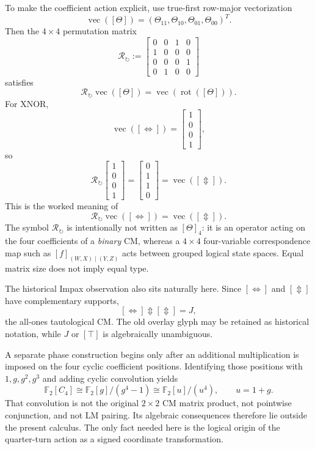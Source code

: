 \documentclass[11pt]{article}
\theoremstyle{definition}
\theoremstyle{remark}
\newcommand{\F}{\mathbb F}
\newcommand{\rot}{\operatorname{rot}}
\newcommand{\vecop}{\operatorname{vec}}
\newcommand{\xor}{\mathbin{\Updownarrow}}
\begin{document}
To make the coefficient action explicit, use true-first row-major vectorization
\[
 \vecop([\Theta])=(\Theta_{11},\Theta_{10},\Theta_{01},\Theta_{00})^T.
\]
Then the $4\times4$ permutation matrix
\begin{equation}
 \mathcal R_{\circlearrowright}:=
 \begin{bmatrix}
 0&0&1&0\\
 1&0&0&0\\
 0&0&0&1\\
 0&1&0&0
 \end{bmatrix}
 \label{eq:rhoquarter}
\end{equation}
satisfies
\[
 \mathcal R_{\circlearrowright}\vecop([\Theta])
 =\vecop(\rot([\Theta])).
\]
For XNOR,
\[
 \vecop([\Leftrightarrow])=
 \begin{bmatrix}1\\0\\0\\1\end{bmatrix},
\]
so
\[
 \mathcal R_{\circlearrowright}
 \begin{bmatrix}1\\0\\0\\1\end{bmatrix}
 =
 \begin{bmatrix}0\\1\\1\\0\end{bmatrix}
 =\vecop([\Updownarrow]).
\]
This is the worked meaning of
\[
 \mathcal R_{\circlearrowright}\vecop([\Leftrightarrow])
 =\vecop([\Updownarrow]).
\]
The symbol $\mathcal R_{\circlearrowright}$ is intentionally not written as $[\Theta]_4$: it is an operator acting on the four coefficients of a \emph{binary} CM, whereas a $4\times4$ four-variable correspondence map such as $[f]_{(W,X)\mid(Y,Z)}$ acts between grouped logical state spaces.  Equal matrix size does not imply equal type.

The historical Impax observation also sits naturally here.  Since $[\Leftrightarrow]$ and $[\Updownarrow]$ have complementary supports,
\[
 [\Leftrightarrow]\xor[\Updownarrow]=J,
\]
the all-ones tautological CM.  The old overlay glyph may be retained as historical notation, while $J$ or $[\top]$ is algebraically unambiguous.

A separate phase construction begins only after an additional multiplication is imposed on the four cyclic coefficient positions.  Identifying those positions with $1,g,g^2,g^3$ and adding cyclic convolution yields
\[
 \F_2[C_4]\cong\F_2[g]/(g^4-1)
 \cong\F_2[u]/(u^4),\qquad u=1+g.
\]
That convolution is not the original $2\times2$ CM matrix product, not pointwise conjunction, and not LM pairing.  Its algebraic consequences therefore lie outside the present calculus.  The only fact needed here is the logical origin of the quarter-turn action as a signed coordinate transformation.
\end{document}
